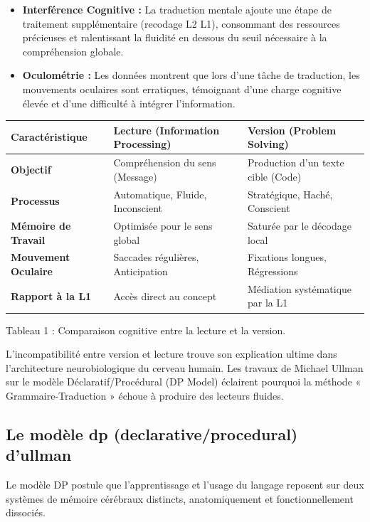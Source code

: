 \begin{itemize}\item \textbf{Interférence Cognitive :} La traduction mentale ajoute une étape de traitement supplémentaire (recodage L2 \-\> L1), consommant des ressources précieuses et ralentissant la fluidité en dessous du seuil nécessaire à la compréhension globale.\cite{II-3-1-ref35}\item \textbf{Oculométrie :} Les données montrent que lors d'une tâche de traduction, les mouvements oculaires sont erratiques, témoignant d'une charge cognitive élevée et d'une difficulté à intégrer l'information.\cite{II-3-1-ref3}\end{itemize}\begin{table}[h!]\small\centering\begin{tabular}{| p{2.3cm} | p{3.5cm} | p{3.5cm} |}\hline\textbf{Caractéristique} & \textbf{Lecture (Information Processing)} & \textbf{Version (Problem Solving)} \\ \hline\textbf{Objectif} & Compréhension du sens (Message) & Production d'un texte cible (Code) \\ \hline\textbf{Processus} & Automatique, Fluide, Inconscient & Stratégique, Haché, Conscient \\ \hline\textbf{Mémoire de Travail} & Optimisée pour le sens global & Saturée par le décodage local \\ \hline\textbf{Mouvement Oculaire} & Saccades régulières, Anticipation & Fixations longues, Régressions \\ \hline\textbf{Rapport à la L1} & Accès direct au concept & Médiation systématique par la L1 \\ \hline\end{tabular}\end{table}Tableau 1 : Comparaison cognitive entre la lecture et la version.\cite{II-3-1-ref3}

L'incompatibilité entre version et lecture trouve son explication ultime dans l'architecture
neurobiologique du cerveau humain. Les travaux de Michael Ullman sur le modèle Déclaratif/Procédural
(DP Model) éclairent pourquoi la méthode « Grammaire-Traduction » échoue à produire des lecteurs
fluides.



\subsection{Le modèle dp (declarative/procedural) d'ullman}

Le modèle DP postule que l'apprentissage et l'usage du langage reposent sur deux systèmes de mémoire
cérébraux distincts, anatomiquement et fonctionnellement dissociés.\cite{II-3-1-ref7}



